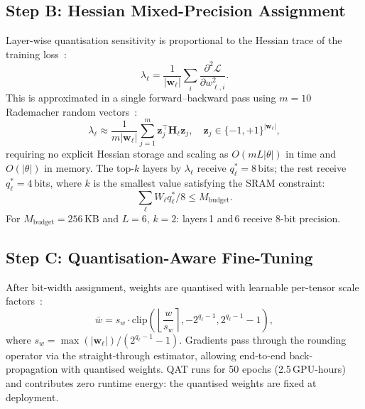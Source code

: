 \documentclass[12pt,a4paper]{article}
\newcommand{\vect}[1]{\boldsymbol{#1}}
\begin{document}
\subsection{Step B: Hessian Mixed-Precision Assignment}
\label{sec:hessian}

Layer-wise quantisation sensitivity is proportional to the Hessian
trace of the training loss~\cite{dong2021hawqv3,frantar2023gptq}:
\begin{equation}
  \lambda_\ell
    = \frac{1}{|\vect{w}_\ell|}
      \sum_i\frac{\partial^2\mathcal{L}}{\partial w_{\ell,i}^2}.
  \label{eq:hessian}
\end{equation}
This is approximated in a single forward--backward pass using
$m=10$ Rademacher random vectors~\cite{nagel2021whitepaper}:
\begin{equation}
  \lambda_\ell \approx
    \frac{1}{m|\vect{w}_\ell|}
    \sum_{j=1}^{m}\vect{z}_j^\top\mathbf{H}_\ell\vect{z}_j,
    \quad \vect{z}_j\in\{-1,+1\}^{|\vect{w}_\ell|},
  \label{eq:hutchinson}
\end{equation}
requiring no explicit Hessian storage and scaling as
$O(mL|\theta|)$ in time and $O(|\theta|)$ in memory.
The top-$k$ layers by $\lambda_\ell$ receive $q_\ell^*=8$\,bits;
the rest receive $q_\ell^*=4$\,bits, where $k$ is the smallest value
satisfying the SRAM constraint:
\begin{equation}
  \sum_\ell W_\ell q_\ell^*/8 \leq M_\mathrm{budget}.
  \label{eq:sram}
\end{equation}
For $M_\mathrm{budget}=256$\,KB and $L=6$, $k=2$:
layers\,1 and\,6 receive 8-bit precision.

\subsection{Step C: Quantisation-Aware Fine-Tuning}
\label{sec:qat}

After bit-width assignment, weights are quantised with learnable
per-tensor scale factors~\cite{xiao2023smoothquant,hubara2021ptq}:
\begin{equation}
  \bar{w} = s_w\cdot\mathrm{clip}\!\left(
    \!\left\lfloor\frac{w}{s_w}\right\rceil,
    -2^{q_\ell-1}, 2^{q_\ell-1}-1
  \right),
  \label{eq:qw}
\end{equation}
where $s_w=\max(|\vect{w}_\ell|)/(2^{q_\ell-1}-1)$.
Gradients pass through the rounding operator via the straight-through
estimator, allowing end-to-end back-propagation with quantised weights.
QAT runs for 50 epochs (2.5\,GPU-hours) and contributes zero runtime
energy: the quantised weights are fixed at deployment.
\end{document}
